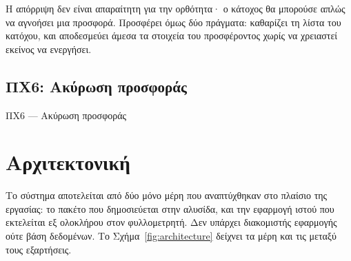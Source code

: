 Η απόρριψη δεν είναι απαραίτητη για την ορθότητα· ο κάτοχος θα μπορούσε απλώς να αγνοήσει
μια προσφορά. Προσφέρει όμως δύο πράγματα: καθαρίζει τη λίστα του κατόχου, και
αποδεσμεύει άμεσα τα στοιχεία του προσφέροντος χωρίς να χρειαστεί εκείνος να ενεργήσει.

\subsection{ΠΧ6: Ακύρωση προσφοράς}

\begin{usecase}{ΠΧ6 — Ακύρωση προσφοράς}
\end{usecase}

\section{Αρχιτεκτονική}
\label{sec:architecture}

Το σύστημα αποτελείται από δύο μόνο μέρη που αναπτύχθηκαν στο πλαίσιο της εργασίας: το
πακέτο  που δημοσιεύεται στην αλυσίδα, και την εφαρμογή ιστού που εκτελείται
εξ ολοκλήρου στον φυλλομετρητή. Δεν υπάρχει διακομιστής εφαρμογής ούτε βάση δεδομένων. Το
Σχήμα~\ref{fig:architecture} δείχνει τα μέρη και τις μεταξύ τους εξαρτήσεις.

